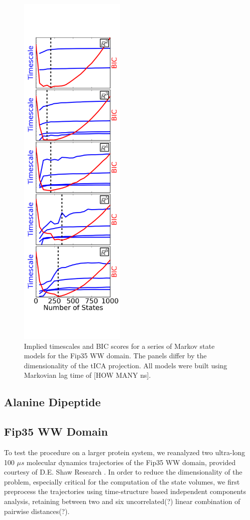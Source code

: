 \documentclass[twocolumn,floatfix,nofootinbib,aps]{revtex4-1}
\begin{document}
\begin{figure}
\centering
\includegraphics[width=2in]{figs/ww_bic_vs_eval_slide_nscounts.png}
\caption{Implied timescales and BIC scores for a series of Markov state models for the Fip35 WW domain. The panels differ by the dimensionality of the tICA projection. All models were built using Markovian lag time of [HOW MANY ns].}
\label{fig:ww}
\end{figure}

\subsection{Alanine Dipeptide}

\subsection{Fip35 WW Domain}

To test the procedure on a larger protein system, we reanalyzed two ultra-long 100 $\mu s$ molecular dynamics trajectories of the Fip35 WW domain\cite{Liu2008Experimental}, provided courtesy of D.E. Shaw Research \cite{Shaw2010Atomic}. In order to reduce the dimensionality of the problem, especially critical for the computation of the state volumes, we first preprocess the trajectories using time-structure based independent components analysis\cite{Schwantes2013Improvements}, retaining between two and six uncorrelated(?) linear combination of pairwise distances(?).
\end{document}
